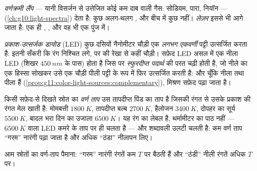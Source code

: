 \begin{definition}[वर्णक्रमी लैंप और लेज़र]\label{def:g11:color-light-sources:lamps}
\emph{वर्णक्रमी लैंप} --- यानी विसर्जन से उत्तेजित
कोई कम दाब वाली गैस: सोडियम, पारा, नियॉन ---  (\cref{ch:g10:light-spectra}) देता है: कुछ अलग-थलग , और बीच में
कुछ नहीं। \emph{लेज़र} इससे भी आगे जाता है: एक ही
, , और वह भी एक  पुंज में।
\end{definition}

\begin{definition}[LED]\label{def:g11:color-light-sources:led}
\emph{प्रकाश-उत्सर्जक डायोड} (LED) कुछ दसियों
नैनोमीटर चौड़ी एक \emph{लगभग एकवर्णी} पट्टी
उत्सर्जित करता है: इतनी सँकरी कि रंग निश्चित लगे, पर  की
रेखा से कहीं चौड़ी। सफ़ेद LED असल में एक नीला LED (शिखर $\qty{450}{nm}$ के पास)
होता है जिस पर \emph{स्फुरदीप्त पदार्थ} की परत
चढ़ी होती है, जो नीले का एक हिस्सा सोखकर उसे एक चौड़ी पीली पट्टी के रूप
में फिर उत्सर्जित करती है: और चूँकि नीला तथा पीला  हैं (\cref{prop:g11:color-light-sources:complementary}),
मिश्रण सफ़ेद पढ़ा जाता है।
\end{definition}

\begin{definition}[वर्ण ताप]\label{def:g11:color-light-sources:colortemp}
किसी सफ़ेद-से दिखते स्रोत का \emph{वर्ण ताप} उस तापदीप्त
पिंड का ताप है जिसकी रंगत से उसके प्रकाश की रंगत मेल खाती है: मोमबत्ती
$\qty{1800}{K}$, तापदीप्त बल्ब $\qty{2700}{K}$, हैलोजन $\qty{3400}{K}$, दोपहर का सूर्य $\qty{5500}{K}$,
बादल भरा दिन का उजाला $\qty{6500}{K}$। यह रंग का लेबल है, थर्मामीटर का पाठ नहीं
--- $\qty{6500}{K}$ वाला LED कमरे के ताप पर ही चलता है --- और शब्दावली उलटी चलती
है: कम वर्ण ताप ``गरम'' नारंगी पढ़ा जाता है और अधिक ``ठंडा'' नीलापन लिए।
\end{definition}

\begin{omfigure}

{\small आम स्रोतों का वर्ण-ताप पैमाना: ``गरम'' नारंगी रंगतें कम $T$
पर बैठती हैं और ``ठंडी'' नीली रंगतें अधिक $T$ पर।}
\end{omfigure}

